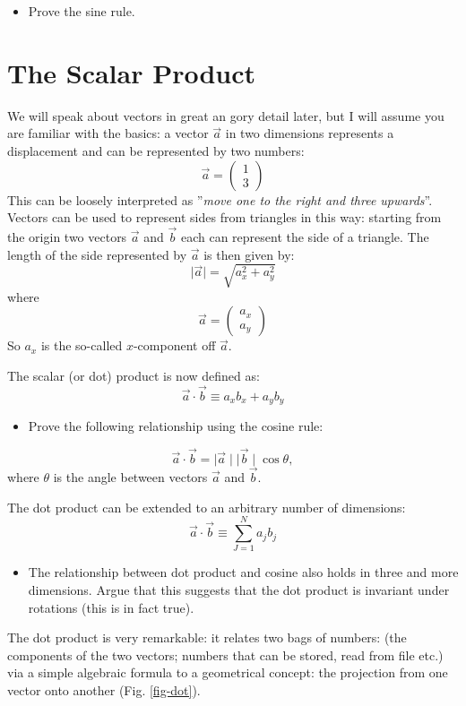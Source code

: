 \documentclass[a4wide]{article}
\begin{document}
\begin{itemize}
\item Prove the sine rule.
\end{itemize}
\section*{The Scalar Product}
We will speak about vectors in great an gory detail later, but I will assume you are familiar with the basics:
a vector $\vec{a}$ in two dimensions represents a displacement and can be represented by two numbers:
$$
\vec{a} = \left( \begin{array}{c} 1 \\ 3 \end{array} \right)
$$
This can be loosely interpreted as ''\emph{move one to the right and three upwards}''. Vectors can be used to represent
sides from triangles in this way: starting from the origin two vectors $\vec{a}$ and $\vec{b}$ each can represent the
side of a triangle. The length of the side represented by $\vec{a}$ is then given by:
$$
\mid \vec{a} \mid = \sqrt{a^2_x + a^2_y}
$$
where
$$
\vec{a} = \left( \begin{array}{c} a_x \\ a_y \end{array} \right)
$$
So $a_x$ is the so-called $x$-component off $\vec{a}$.

The scalar (or dot)  product is now defined as:
$$
\vec{a} \cdot \vec{b} \equiv a_xb_x + a_yb_y
$$ 

\begin{itemize}
  \item Prove the following relationship using the cosine rule:
\end{itemize}
$$
\vec{a} \cdot \vec{b} = \mid  \vec{a}  \mid \mid \vec{b}  \mid \cos \theta,
$$
where $\theta$ is the angle between vectors $\vec{a}$ and $\vec{b}$.

The dot product can be extended to an arbitrary number of dimensions:
$$
\vec{a} \cdot \vec{b} \equiv \sum^{N}_{J=1} a_j b_j
$$
\begin{itemize}
\item The relationship between dot product and cosine also holds in three and more dimensions. Argue that this suggests that the dot product is invariant under rotations 
(this is in fact true).
\end{itemize}
The dot product is very remarkable: it relates two bags of numbers: (the components of the two vectors; numbers that can be stored, read from file etc.) via
a simple algebraic formula to a geometrical concept: the projection from one vector onto another (Fig. \ref{fig-dot}).
\end{document}
